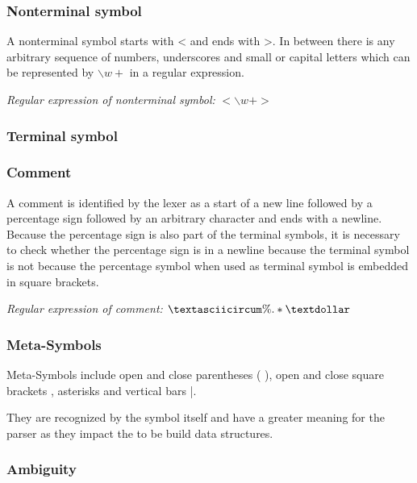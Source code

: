 \subsubsection{Nonterminal symbol}

A nonterminal symbol starts with \dq <\dq\; and ends with \dq >\dq. In between there is any arbitrary sequence of numbers, underscores and small or capital letters which can be represented by $\backslash w+$ in a regular expression.

\textit{Regular expression of nonterminal symbol:}  $<\backslash w+>$

\subsubsection{Terminal symbol}


\subsubsection{Comment}

A comment is identified by the lexer as a start of a new line followed by a percentage sign followed by an arbitrary character and ends with a newline. Because the percentage sign is also part of the terminal symbols, it is necessary to check whether the percentage sign is in a newline because the terminal symbol is not because the percentage symbol when used as terminal symbol is embedded in square brackets.    

\textit{Regular expression of comment:}  $\textasciicircum \%.*\textdollar $

\subsubsection{Meta-Symbols}

Meta-Symbols include open and close parentheses \dq( )\dq, open and close square brackets \dq[ ]\dq, asterisks \dq *\dq and vertical bars \dq |\dq.

They are recognized by the symbol itself and have a greater meaning for the parser as they impact the to be build data structures. 

\subsubsection{Ambiguity}

